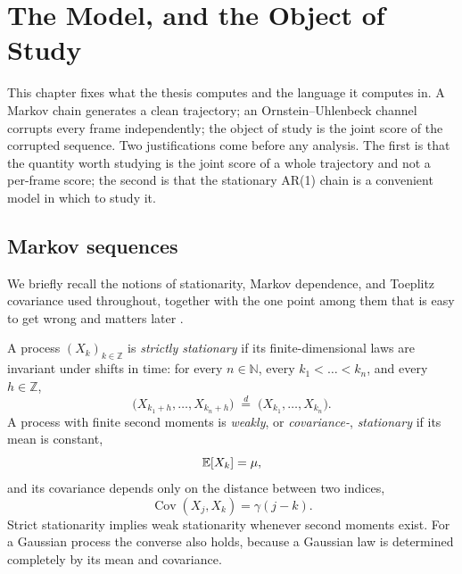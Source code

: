 \chapter{The Model, and the Object of Study}\label{ch:model}
\label{ch:background}\label{ch:graphs}\label{ch:graphical}\label{ch:development}

This chapter fixes what the thesis computes and the language it computes in.
A Markov chain generates a clean trajectory; an Ornstein--Uhlenbeck channel
corrupts every frame independently; the object of study is the joint score of
the corrupted sequence. Two justifications come before any analysis. The first
is that the quantity worth studying is the joint score of a whole trajectory
and not a per-frame score; the second is that the stationary AR(1) chain is a convenient
model in which to study it.

\section{Markov sequences}\label{sec:stationarity}\label{sec:markov}

We briefly recall the notions of stationarity, Markov dependence, and
Toeplitz covariance used throughout, together with the one point among them
that is easy to get wrong and matters later \citep{brockwell1991time}.

A process $(X_k)_{k \in \mathbb{Z}}$ is \emph{strictly stationary} if its
finite-dimensional laws are invariant under shifts in time: for every
$n \in \mathbb{N}$, every $k_1 < \dots < k_n$, and every $h \in \mathbb{Z}$,
\begin{equation}
  \big(X_{k_1+h}, \dots, X_{k_n+h}\big)
  \;\overset{d}{=}\;
  \big(X_{k_1}, \dots, X_{k_n}\big).
  \label{eq:strict-stationary}
\end{equation}
A process with finite second moments is \emph{weakly}, or
\emph{covariance-}, \emph{stationary} if its mean is constant,
\begin{equation}
  \mathbb{E}[X_k] = \mu ,
\end{equation}
and its covariance depends only on the distance between two indices,
\begin{equation}
  \operatorname{Cov}(X_j,X_k) = \gamma(j-k).
  \label{eq:weak-stationary}
\end{equation}
Strict stationarity implies weak stationarity whenever second moments exist.
For a Gaussian process the converse also holds, because a Gaussian law is
determined completely by its mean and covariance.

